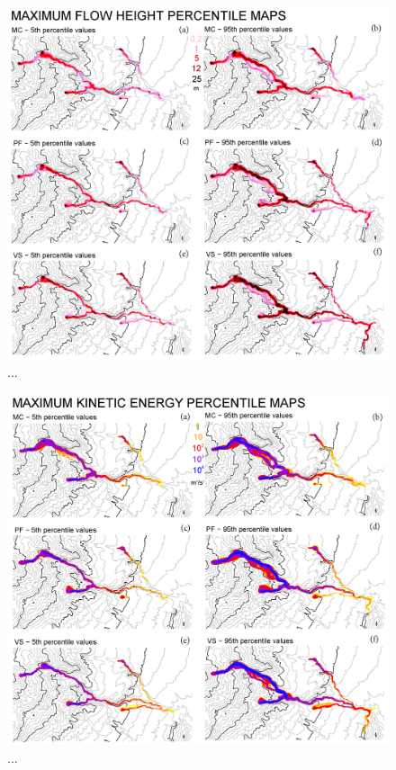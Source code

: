 \documentclass{article}
\begin{document}
\begin{figure}[H]
\centering
\includegraphics[width=1\textwidth]{Fig3.png}
\caption{...}
\label{Fig3}
\end{figure}

\begin{figure}[H]
\centering
\includegraphics[width=1\textwidth]{Fig4.png}
\caption{...}
\label{Fig4}
\end{figure}
\end{document}
